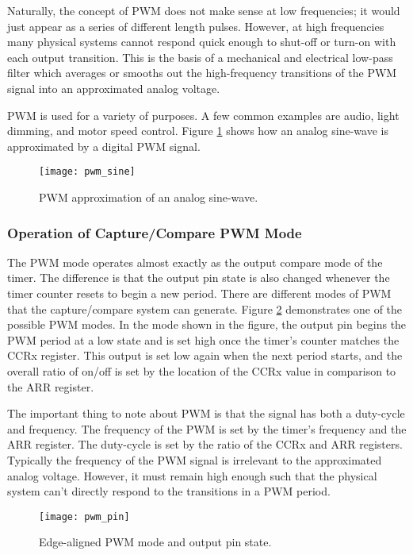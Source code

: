 \documentclass[11pt,fleqn]{book} %
\begin{document}
    Naturally, the concept of PWM does not make sense at low frequencies; it would just appear as a series of different length pulses. However, at high frequencies many physical systems cannot respond quick enough to shut-off or turn-on with each output transition. This is the basis of a mechanical and electrical low-pass filter which averages or smooths out the high-frequency transitions of the PWM signal into an approximated analog voltage.
    
    PWM is used for a variety of purposes. A few common examples are audio, light dimming, and motor speed control. Figure \ref{pwm_sine} shows how an analog sine-wave is approximated by a digital PWM signal. 

    \begin{figure}[]
        \centering\texttt{[image: pwm\_sine]}
        \caption{PWM approximation of an analog sine-wave.}
        \label{pwm_sine}
    \end{figure}
    
    \subsubsection{Operation of Capture/Compare PWM Mode}
    The PWM mode operates almost exactly as the output compare mode of the timer. The difference is that the output pin state is also changed whenever the timer counter resets to begin a new period. There are different modes of PWM that the capture/compare system can generate. Figure \ref{pwm_pin} demonstrates one of the possible PWM modes. In the mode shown in the figure, the output pin begins the PWM period at a low state and is set high once the timer's counter matches the CCRx register. This output is set low again when the next period starts, and the overall ratio of on/off is set by the location of the CCRx value in comparison to the ARR register. 
   
   The important thing to note about PWM is that the signal has both a duty-cycle and frequency. The frequency of the PWM is set by the timer's frequency and the ARR register. The duty-cycle is set by the ratio of the CCRx and ARR registers. Typically the frequency of the PWM signal is irrelevant to the approximated analog voltage. However, it must remain high enough such that the physical system can't directly respond to the transitions in a PWM period. 
   

     \begin{figure}[]
        \centering\texttt{[image: pwm\_pin]}
        \caption{Edge-aligned PWM mode and output pin state.}
        \label{pwm_pin}
    \end{figure}
\end{document}
